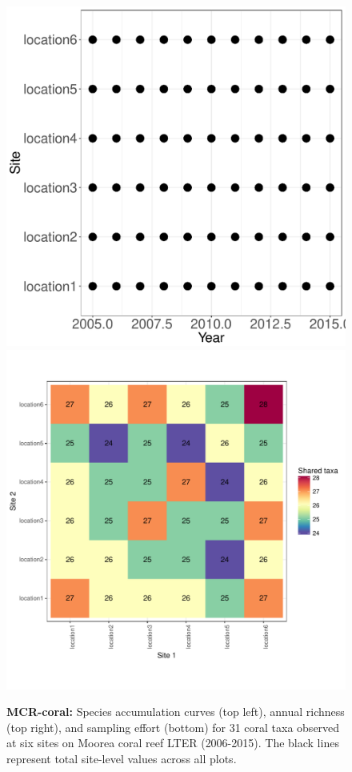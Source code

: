 \documentclass[11pt, oneside]{article}
\begin{document}
\begin{figure}[h!]
\includegraphics[scale = 0.4]{mcr-coral-castorani_spatiotemporal_sampling_effort.pdf}
\includegraphics[scale = 0.4]{mcr-coral-castorani_spp_shared.pdf}
\caption{{\bf MCR-coral:} Species accumulation curves (top left),  annual richness (top right), and sampling effort (bottom)  for 31 coral taxa observed at six sites on Moorea coral reef LTER (2006-2015). The black lines represent total site-level values across all plots.}
\label{mcr-coral}
\end{figure}
\end{document}
